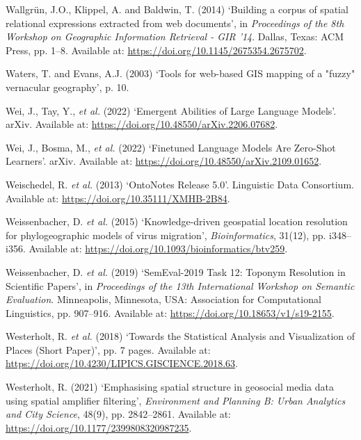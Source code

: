 \documentclass[
  letterpaper,
  11pt,
  english,
  onehalfspacing,
  headsepline]{MastersDoctoralThesis}
\newlength{\cslhangindent}
\newlength{\cslentryspacingunit} %
\newenvironment{CSLReferences}[2] %
 {%
  \setlength{\parindent}{0pt}
  \ifodd #1
  \let\oldpar\par
  \def\par{\hangindent=\cslhangindent\oldpar}
  \fi
  \setlength{\parskip}{#2\cslentryspacingunit}
 }%
 {}
\begin{document}
\begin{CSLReferences}{0}{0}
\leavevmode{}%
Wallgrün, J.O., Klippel, A. and Baldwin, T. (2014) {`Building a corpus
of spatial relational expressions extracted from web documents'}, in
\emph{Proceedings of the 8th {Workshop} on {Geographic Information
Retrieval} - {GIR} '14}. {Dallas, Texas}: {ACM Press}, pp. 1--8.
Available at: \url{https://doi.org/10.1145/2675354.2675702}.

\leavevmode{}%
Waters, T. and Evans, A.J. (2003) {`Tools for web-based {GIS} mapping of
a "fuzzy" vernacular geography'}, p. 10.

\leavevmode{}%
Wei, J., Tay, Y., \emph{et al.} (2022) {`Emergent {Abilities} of {Large
Language Models}'}. {arXiv}. Available at:
\url{https://doi.org/10.48550/arXiv.2206.07682}.

\leavevmode{}%
Wei, J., Bosma, M., \emph{et al.} (2022) {`Finetuned {Language Models
Are Zero-Shot Learners}'}. {arXiv}. Available at:
\url{https://doi.org/10.48550/arXiv.2109.01652}.

\leavevmode{}%
Weischedel, R. \emph{et al.} (2013) {`{OntoNotes Release} 5.0'}.
{Linguistic Data Consortium}. Available at:
\url{https://doi.org/10.35111/XMHB-2B84}.

\leavevmode{}%
Weissenbacher, D. \emph{et al.} (2015) {`Knowledge-driven geospatial
location resolution for phylogeographic models of virus migration'},
\emph{Bioinformatics}, 31(12), pp. i348--i356. Available at:
\url{https://doi.org/10.1093/bioinformatics/btv259}.

\leavevmode{}%
Weissenbacher, D. \emph{et al.} (2019) {`{SemEval-2019 Task} 12:
{Toponym Resolution} in {Scientific Papers}'}, in \emph{Proceedings of
the 13th {International Workshop} on {Semantic Evaluation}}.
{Minneapolis, Minnesota, USA}: {Association for Computational
Linguistics}, pp. 907--916. Available at:
\url{https://doi.org/10.18653/v1/s19-2155}.

\leavevmode{}%
Westerholt, R. \emph{et al.} (2018) {`Towards the {Statistical Analysis}
and {Visualization} of {Places} ({Short Paper})'}, pp. 7 pages.
Available at: \url{https://doi.org/10.4230/LIPICS.GISCIENCE.2018.63}.

\leavevmode{}%
Westerholt, R. (2021) {`Emphasising spatial structure in geosocial media
data using spatial amplifier filtering'}, \emph{Environment and Planning
B: Urban Analytics and City Science}, 48(9), pp. 2842--2861. Available
at: \url{https://doi.org/10.1177/2399808320987235}.


\end{CSLReferences}
\end{document}
